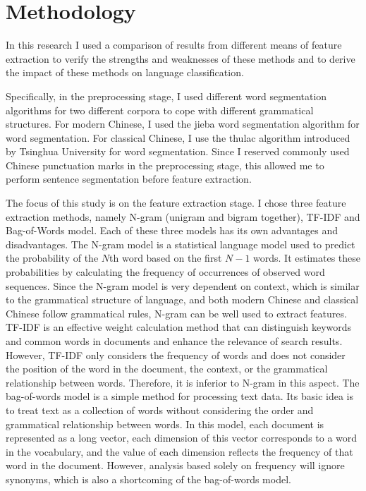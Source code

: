 \documentclass[11pt]{article}
\begin{document}
\section{Methodology}

In this research I used a comparison of results from different means of feature extraction to verify the strengths and weaknesses of these methods and to derive the impact of these methods on language classification.

Specifically, in the preprocessing stage, I used different word segmentation algorithms for two different corpora to cope with different grammatical structures. For modern Chinese, I used the jieba word segmentation algorithm for word segmentation. For classical Chinese, I use the thulac algorithm introduced by Tsinghua University for word segmentation. Since I reserved commonly used Chinese punctuation marks in the preprocessing stage, this allowed me to perform sentence segmentation before feature extraction.

The focus of this study is on the feature extraction stage. I chose three feature extraction methods, namely N-gram (unigram and bigram together), TF-IDF and Bag-of-Words model. Each of these three models has its own advantages and disadvantages. The N-gram model is a statistical language model used to predict the probability of the $N$th word based on the first $N-1$ words. It estimates these probabilities by calculating the frequency of occurrences of observed word sequences\cite{goodman2001bit}. Since the N-gram model is very dependent on context, which is similar to the grammatical structure of language, and both modern Chinese and classical Chinese follow grammatical rules, N-gram can be well used to extract features. TF-IDF is an effective weight calculation method that can distinguish keywords and common words in documents and enhance the relevance of search results. However, TF-IDF only considers the frequency of words and does not consider the position of the word in the document, the context, or the grammatical relationship between words\cite{brin1998anatomy}. Therefore, it is inferior to N-gram in this aspect. The bag-of-words model is a simple method for processing text data. Its basic idea is to treat text as a collection of words without considering the order and grammatical relationship between words. In this model, each document is represented as a long vector, each dimension of this vector corresponds to a word in the vocabulary, and the value of each dimension reflects the frequency of that word in the document\cite{manning2008introduction}. However, analysis based solely on frequency will ignore synonyms, which is also a shortcoming of the bag-of-words model.
\end{document}
